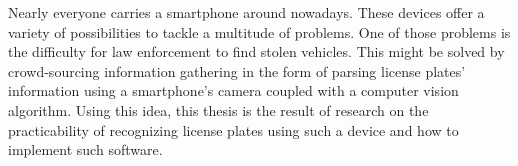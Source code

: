\samenvatting

Nearly everyone carries a smartphone around nowadays. These devices offer a variety of possibilities to tackle a multitude of problems. One of those problems is the difficulty for law enforcement to find stolen vehicles. This might be solved by crowd-sourcing information gathering in the form of parsing license plates' information using a smartphone's camera coupled with a computer vision algorithm. Using this idea, this thesis is the result of research on the practicability of recognizing license plates using such a device and how to implement such software.